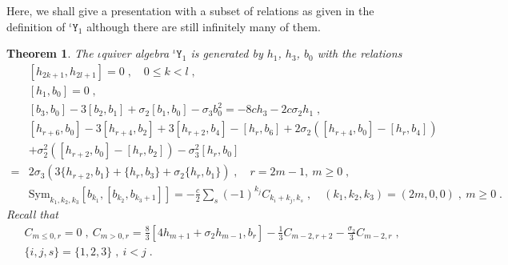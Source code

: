\documentclass[11pt]{article}
\numberwithin{equation}{section}
\numberwithin{figure}{section}
\numberwithin{table}{section}
\newtheorem{theorem}{Theorem}[section]
\begin{document}
Here, we shall give a presentation with a subset of relations as given in the definition of ${}^\iota\mathtt{Y}_1$ although there are still infinitely many of them.
\begin{theorem}
	The $\iota$quiver algebra ${}^\iota\mathtt{Y}_1$ is generated by $h_1$, $h_3$, $b_0$ with the relations
	\begin{subequations}
		\begin{align}
			&[h_{2k+1},h_{2l+1}]=0\;,\quad 0\leq k<l\;,\\
			&[h_1,b_0]=0\;,\\
			&[b_3,b_0]-3[b_2,b_1]+\sigma_2[b_1,b_0]-\sigma_3b_0^2=-8ch_3-2c\sigma_2h_1\;,\\
			&[h_{r+6},b_0]-3[h_{r+4},b_2]+3[h_{r+2},b_4]-[h_r,b_6]+2\sigma_2\left([h_{r+4},b_0]-[h_r,b_4]\right)\nonumber\\
			&+\sigma_2^2\left([h_{r+2},b_0]-[h_r,b_2]\right)-\sigma_3^2[h_r,b_0]\nonumber\\
			=&2\sigma_3\left(3\{h_{r+2},b_1\}+\{h_r,b_3\}+\sigma_2\{h_r,b_1\}\right)\;,\quad r=2m-1,~m\geq0\;,\\
			&\mathrm{Sym}_{k_1,k_2,k_3}[b_{k_1},[b_{k_2},b_{k_3+1}]]=-\frac{c}{2}\sum_s(-1)^{k_j}C_{k_i+k_j,k_s}\;,\quad(k_1,k_2,k_3)=(2m,0,0)\;,~m\geq0\;.
		\end{align}
	\end{subequations}
	Recall that
	\begin{subequations}
	    \begin{align}
	        &C_{m\leq0,r}=0\;,~C_{m>0,r}=\frac{8}{3}[4h_{m+1}+\sigma_2h_{m-1},b_r]-\frac{1}{3}C_{m-2,r+2}-\frac{\sigma_2}{3}C_{m-2,r}\;,\\
	        &\{i,j,s\}=\{1,2,3\}\;,~i<j\;.
        \end{align}
    \end{subequations}
\end{theorem}
\end{document}
